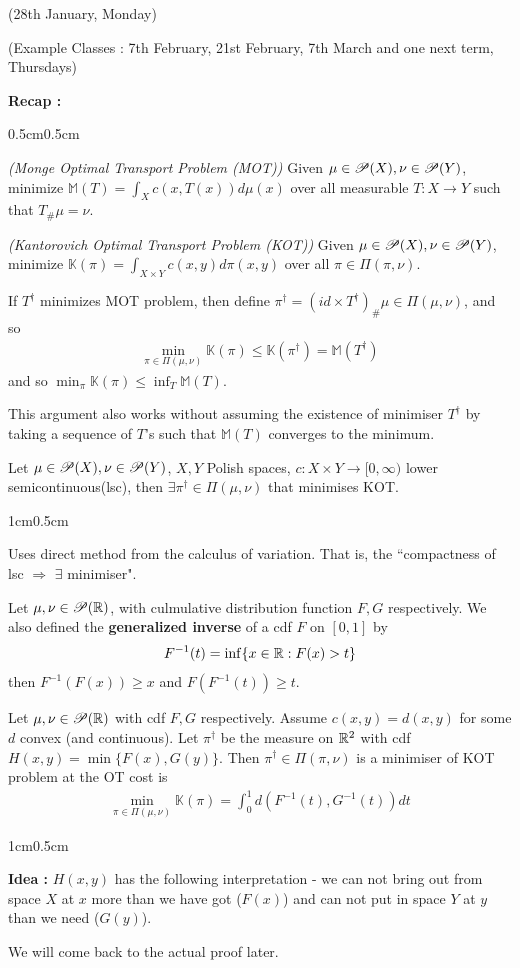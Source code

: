 \documentclass[12pt,a4paper]{article}
\newenvironment{proof}
{\begin{changemargin}{1cm}{0.5cm} 
	}%
	{\end{changemargin}
}
\newenvironment{subproof}
{\begin{changemargin}{0.5cm}{0.5cm} 
	}%
	{\end{changemargin}
}
\newenvironment{p}
{\begin{proof} 
	}%
	{\end{proof}
}
\begin{document}
\newday

(28th January, Monday)
\s

(Example Classes : 7th February, 21st February, 7th March and one next term, Thursdays)
\s

\textbf{Recap :}
\begin{subproof}
 \emph{(Monge Optimal Transport Problem (MOT))} Given $\mu \in \mathscr{P}(X), \nu\in \mathscr{P}(Y)$, minimize $\mathbb{M}(T) =\int_X c(x, T(x)) d\mu(x)$ over all measurable $T:X\rightarrow Y$ such that $T_{\#} \mu = \nu$.

 \emph{(Kantorovich Optimal Transport Problem (KOT))} Given $\mu\in \mathscr{P}(X),\nu\in\mathscr{P}(Y)$, minimize $\mathbb{K}(\pi) = \int_{X\times Y} c(x,y) d\pi(x,y)$ over all $\pi \in \Pi(\pi, \nu)$.
\s

If $T^{\dagger}$ minimizes MOT problem, then define $\pi^{\dagger} = (id \times T^{\dagger})_{\#} \mu \in \Pi(\mu, \nu)$, and so
\begin{align*}
\min_{\pi \in \Pi(\mu, \nu)} \mathbb{K}(\pi) \leq \mathbb{K}(\pi^{\dagger}) = \mathbb{M}(T^{\dagger})
\end{align*}
and so $\min_{\pi} \mathbb{K}(\pi) \leq \inf_T \mathbb{M}(T)$.

\quad This argument also works without assuming the existence of minimiser $T^{\dagger}$ by taking a sequence of $T$'s such that $\mathbb{M}(T)$ converges to the minimum.
\s

 Let $\mu \in \mathscr{P}(X),\nu\in\mathscr{P}(Y)$, $X,Y$ Polish spaces, $c:X\times Y \rightarrow [0, \infty)$ lower semicontinuous(lsc), then $\exists \pi^{\dagger} \in \Pi(\mu, \nu)$ that minimises KOT.
\begin{p}
\pf Uses direct method from the calculus of variation. That is, the ``compactness of lsc $\Rightarrow$ $\exists$ minimiser".
\end{p}
\end{subproof}
\s

Let $\mu, \nu \in \mathscr{P}(\mathbb{R})$, with culmulative distribution function $F,G$ respectively. We also defined the \textbf{generalized inverse} of a cdf $F$ on $[0,1]$ by
\begin{align*}
F^{-1}(t) = \inf \{x\in \mathbb{R} : F(x) > t\}
\end{align*}
then $F^{-1}(F(x))\geq x$ and $F(F^{-1}(t)) \geq t$.
\s

 Let $\mu, \nu \in\mathscr{P}(\mathbb{R})$ with cdf $F,G$ respectively. Assume $c(x,y) =d(x,y)$ for some $d$ convex (and continuous).  Let $\pi^{\dagger}$ be the measure on $\mathbb{R}^2$ with cdf $H(x,y) = \min\{F(x), G(y)\}$. Then $\pi^{\dagger} \in \Pi(\pi, \nu)$ is a minimiser of KOT problem at the OT cost is
\begin{align*}
\min_{\pi \in \Pi(\mu, \nu)} \mathbb{K}(\pi) = \int_0^1 d(F^{-1}(t), G^{-1}(t))dt
\end{align*}
\begin{p}
\textbf{Idea :} $H(x,y)$ has the following interpretation - we can not bring out from space $X$ at $x$ more than we have got ($F(x)$) and can not put in space $Y$ at $y$ than we need ($G(y)$).

\quad We will come back to the actual proof later.
\end{p}
\s
\end{document}
